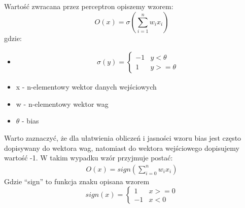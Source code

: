 \documentclass{article}
\begin{document}
Wartość zwracana przez perceptron opiszemy wzorem:
\begin{equation*}
    O(x)=\sigma(\sum\limits_{i=1}^{n}{w_i x_i})
\end{equation*}
gdzie:
\begin{itemize}
    \item
          \begin{align*}
              \sigma(y)=
              \begin{cases}
                  -1 & y<\theta  \\
                  1  & y>=\theta
              \end{cases}
          \end{align*}
    \item x - n-elementowy wektor danych wejściowych
    \item w - n-elementowy wektor wag
    \item $\theta$ - bias
\end{itemize}

Warto zaznaczyć, że dla ułatwienia obliczeń i jasności wzoru bias jest często dopisywany do wektora wag, natomiast do wektora wejściowego dopisujemy wartość -1.
W takim wypadku wzór przyjmuje postać:
\begin{align*}
    O(x)=sign(\sum\limits_{i=0}^{n}{w_i x_i})
\end{align*}
Gdzie ``sign'' to funkcja znaku opisana wzorem
\begin{equation*}
    sign(x)=\begin{cases}
        1  & x>=0 \\
        -1 & x<0
    \end{cases}
\end{equation*}
\end{document}
